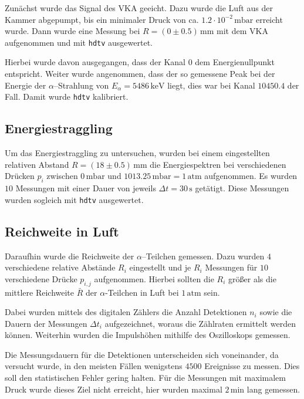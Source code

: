 \documentclass[12pt,a4paper]{scrartcl}
\numberwithin{equation}{section} %
\begin{document}
Zunächst wurde das Signal des VKA geeicht. Dazu wurde die Luft aus der Kammer abgepumpt, bis ein minimaler Druck von ca. $1.2\cdot10^{-2}\mathrm{\,mbar}$ erreicht wurde. Dann wurde eine Messung bei $R=(0\pm0.5)\mathrm{\,mm}$ mit dem VKA aufgenommen und mit \texttt{hdtv} \cite{hdtv} ausgewertet.

Hierbei wurde davon ausgegangen, dass der Kanal $0$ dem Energienullpunkt entspricht. Weiter wurde angenommen, dass der so gemessene Peak bei der Energie der $\alpha$--Strahlung von $E_\alpha = 5486\mathrm{\,keV}$ liegt, dies war bei Kanal $10450.4$ der Fall. Damit wurde \texttt{hdtv} kalibriert.

\hypertarget{energiestraggling}{%
\subsection{Energiestraggling}\label{energiestraggling}}

Um das Energiestraggling zu untersuchen, wurden bei einem eingestellten relativen Abstand $R=(18\pm 0.5)\mathrm{\,mm}$ die Energiespektren bei verschiedenen Drücken $p_i$ zwischen $0\mathrm{\,mbar}$ und $1013.25\mathrm{\,mbar}=1\mathrm{\,atm}$ aufgenommen. Es wurden $10$ Messungen mit einer Dauer von jeweils $\Delta t=30\mathrm{\,s}$ getätigt. Diese Messungen wurden sogleich mit \texttt{hdtv} \cite{hdtv} ausgewertet.

\hypertarget{reichweite-in-luft}{%
\subsection{Reichweite in Luft}\label{reichweite-in-luft}}

Daraufhin wurde die Reichweite der $\alpha$--Teilchen gemessen. Dazu wurden $4$ verschiedene relative Abstände $R_i$ eingestellt und je $R_i$ Messungen für $10$ verschiedene Drücke $p_{i,j}$ aufgenommen. Hierbei sollten die $R_i$ größer als die mittlere Reichweite $\bar R$ der $\alpha$-Teilchen in Luft bei $1\mathrm{\,atm}$ sein.

Dabei wurden mittels des digitalen Zählers die Anzahl Detektionen $n_i$ sowie die Dauern der Messungen $\Delta t_i$ aufgezeichnet, woraus die Zählraten ermittelt werden können. Weiterhin wurden die Impulshöhen mithilfe des Oszilloskops gemessen.

Die Messungsdauern für die Detektionen unterscheiden sich voneinander, da versucht wurde, in den meisten Fällen wenigstens $4500$ Ereignisse zu messen. Dies soll den statistischen Fehler gering halten. Für die Messungen mit maximalem Druck wurde dieses Ziel nicht erreicht, hier wurden maximal $2\mathrm{\,min}$ lang gemessen.
\end{document}
